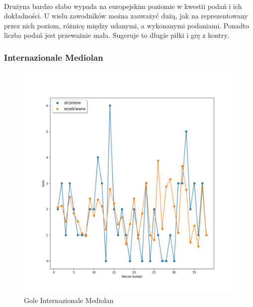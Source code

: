 \documentclass[12pt, letterpaper]{article}
\begin{document}
\paragraph{} Drużyna bardzo słabo wypada na europejskim poziomie w kwestii podań i ich dokładności. U wielu zawodników można zauważyć dużą, jak na reprezentowany przez nich poziom, różnicę między udanymi, a wykonanymi podaniami. Ponadto liczba podań jest przeważnie mała. Sugeruje to długie piłki i grę z kontry.
\pagebreak

\subsubsection{Internazionale Mediolan}
\begin{figure}[ht]
    \centering
    \includegraphics[width=.8\textwidth]{images/Inter_goals.png}
    \caption{Gole Internazionale Mediolan}
    \label{fig:enter-label}
\end{figure}
\end{document}
